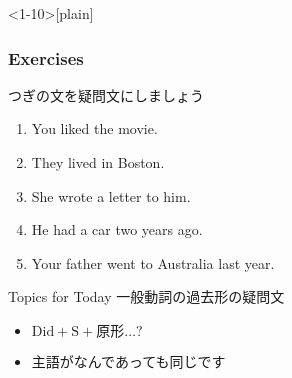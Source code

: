 \documentclass[aspectratio=169,xcolor={dvipsnames,table}]{beamer}
\newcommand{\myaudio}[1]{\href{#1}{\faVolumeUp}}
\begin{document}
\begin{frame}<1-10>[plain]\frametitle{Exercises}

つぎの文を疑問文にしましょう

 \begin{enumerate}
  \item<1-> You liked the movie.\hspace{59.7pt}
  \item<1-> They lived in Boston.\hspace{62pt}%
  \item<1-> She wrote a letter to him.\hspace{42pt}%
  \item<1-> He had  a car two years ago.\hspace{30.5pt}%
  \item<1-> Your father went to  Australia last year.\\
 \mbox{}\hfill{}
 \end{enumerate}

\begin{exampleblock}{Topics for Today}
\small
一般動詞の過去形の疑問文
\begin{itemize}
 \item  \textcolor{NavyBlue}{\bfseries $\text{Did} + \text{S} + \text{原形} \ldots ?$}
 \item  主語がなんであっても同じです
\end{itemize}
      \end{exampleblock}

\vspace{-10pt}
\mbox{}\hfill\myaudio{./audio/027_past_did_you_04.mp3}


\end{frame}
\end{document}
